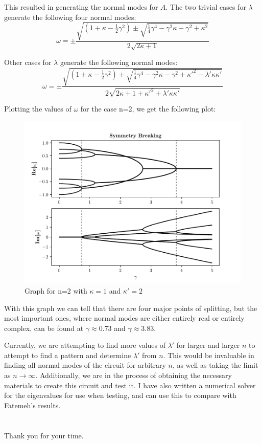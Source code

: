 \documentclass[11pt]{article}
\begin{document}
This resulted in generating the normal modes for $A$. The two trivial cases for $\lambda$ generate the following four normal modes:
\[
\omega = \pm \frac{\sqrt{(1+\kappa-\frac{1}{2}\gamma^2) \pm \sqrt{\frac{1}{4}\gamma^4 - \gamma^2 \kappa - \gamma^2 + \kappa^2}}}{2 \sqrt{2\kappa + 1}}
\]

Other cases for $\lambda$ generate the following normal modes:
\[
\omega = \pm \frac{\sqrt{(1 + \kappa - \frac{1}{2}\gamma^2) \pm \sqrt{\frac{1}{4}\gamma^4 - \gamma^2 \kappa - \gamma^2 + \kappa'^2 - \lambda' \kappa \kappa'}}}{2 \sqrt{2\kappa + 1 + \kappa'^2 + \lambda' \kappa \kappa'}}
\]

Plotting the values of $\omega$ for the case n=2, we get the following plot:
\begin{figure}[H]
	\centering
	\includegraphics[scale=0.8]{pt_breaking.pdf}
	\caption{Graph for n=2 with $\kappa = 1$ and $\kappa' = 2$}
\end{figure}

With this graph we can tell that there are four major points of splitting, but the most important ones, where normal modes are either entirely real or entirely complex, can be found at $\gamma \approx 0.73$ and $\gamma \approx 3.83$.

Currently, we are attempting to find more values of $\lambda'$ for larger and larger $n$ to attempt to find a pattern and determine $\lambda'$ from $n$. This would be invaluable in finding all normal modes of the circuit for arbitrary $n$, as well as taking the limit as $n \to \infty$. Additionally, we are in the process of obtaining the necessary materials to create this circuit and test it. I have also written a numerical solver for the eigenvalues for use when testing, and can use this to compare with Fatemeh's results.
\\
\\
\\
Thank you for your time.
\end{document}
